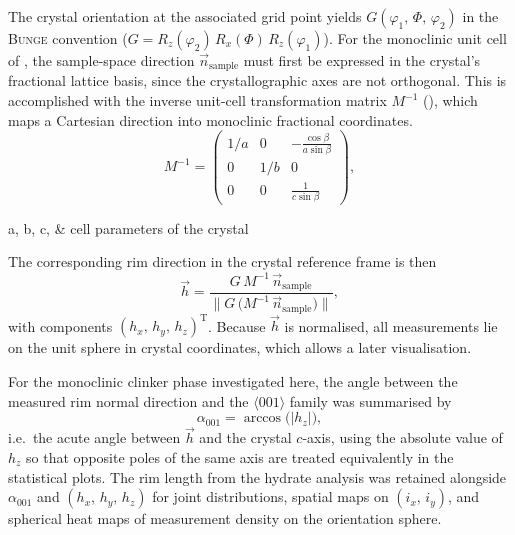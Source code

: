 The crystal orientation at the associated grid point yields $G(\varphi_1,\,\Phi,\,\varphi_2)$ in the \textsc{Bunge} convention ($G = R_{z}(\varphi_2)\,R_{x}(\Phi)\,R_{z}(\varphi_1)$).
For the monoclinic unit cell of , the sample-space direction $\vec{n}_\mathrm{sample}$ must first be expressed in the crystal's fractional lattice basis, since the crystallographic axes are not orthogonal.
This is accomplished with the inverse unit-cell transformation matrix $M^{-1}$ (), which maps a Cartesian direction into monoclinic fractional coordinates.
\begin{equation}
    \label{eq:monoclinic-Minv}
    M^{-1} =
    \begin{pmatrix}
        1/a & 0 & -\frac{\cos\beta}{a\sin\beta} \\
        0   & 1/b & 0 \\
        0   & 0 & \frac{1}{c\sin\beta}
    \end{pmatrix},
\end{equation}
\begin{conditions}
	a, b, c, \beta	&	cell parameters of the crystal \\
\end{conditions}

The corresponding rim direction in the crystal reference frame is then
\begin{equation}
    \label{eq:h-crystal}
    \vec{h} = \frac{G\,M^{-1}\,\vec{n}_\mathrm{sample}}{\lVert G\,\bigl(M^{-1}\,\vec{n}_\mathrm{sample}\bigr)\rVert},
\end{equation}
with components $(h_x,\,h_y,\,h_z)^\mathrm{T}$.
Because $\vec{h}$ is normalised, all measurements lie on the unit sphere in crystal coordinates, which allows a later visualisation.

For the monoclinic clinker phase investigated here, the angle between the measured rim normal direction and the $\langle001\rangle$ family was summarised by
\begin{equation}
	\label{eq:angle-001}
	\alpha_{001} = \arccos\bigl(\lvert h_z\rvert\bigr),
\end{equation}
i.e.\ the acute angle between $\vec{h}$ and the crystal $c$-axis, using the absolute value of $h_z$ so that opposite poles of the same axis are treated equivalently in the statistical plots.
The rim length from the hydrate analysis was retained alongside $\alpha_{001}$ and $(h_x,\,h_y,\,h_z)$ for joint distributions, spatial maps on $(i_x,\,i_y)$, and spherical heat maps of measurement density on the orientation sphere.

